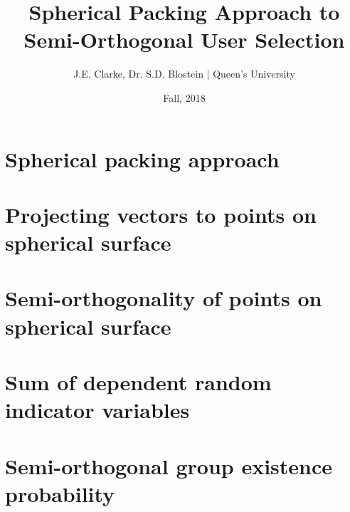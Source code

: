 \documentclass[11pt]{article}
\title{Spherical Packing Approach to Semi-Orthogonal User Selection}
\author{J.E. Clarke, Dr. S.D. Blostein | Queen's University}
\date{Fall, 2018}
\begin{document}
	\maketitle
	\newpage
    \section{Spherical packing approach}
        
        
    \section{Projecting vectors to points on spherical surface}
        
    \section{Semi-orthogonality of points on spherical surface}
        
    \section{Sum of dependent random indicator variables}
    \section{Semi-orthogonal group existence probability}

    \newpage

    \newpage	
 	\begingroup
 		\renewcommand{\section}[2]{}%
 		
 		
 	\endgroup
\end{document}

